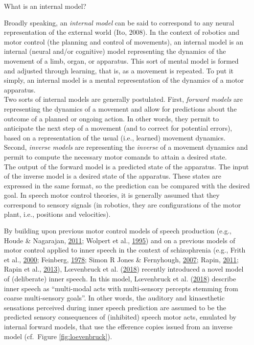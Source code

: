 \documentclass[a4paper,12pt,twoside,onecolumn,openright,final,oldfontcommands]{memoir}
\begin{document}
\begin{mybox}[label = model]{What is an internal model?}

Broadly speaking, an \textit{internal model} can be said to correspond to any neural representation of the external world (Ito, 2008). In the context of robotics and motor control (the planning and control of movements), an internal model is an internal (neural and/or cognitive) model representing the dynamics of the movement of a limb, organ, or apparatus. This sort of mental model is formed and adjusted through learning, that is, as a movement is repeated. To put it simply, an internal model is a mental representation of the dynamics of a motor apparatus.\\

Two sorts of internal models are generally postulated. First, \textit{forward models} are representing the dynamics of a movement and allow for predictions about the outcome of a planned or ongoing action. In other words, they permit to anticipate the next step of a movement (and to correct for potential errors), based on a representation of the usual (i.e., learned) movement dynamics. Second, \textit{inverse models} are representing the \textit{inverse} of a movement dynamics and permit to compute the necessary motor comands to attain a desired state.\\

The output of the forward model is a predicted state of the apparatus. The input of the inverse model is a desired state of the apparatus. These states are expressed in the same format, so the prediction can be compared with the desired goal. In speech motor control theories, it is generally assumed that they correspond to sensory signals (in robotics, they are configurations of the motor plant, i.e., positions and velocities).

\end{mybox}

By building upon previous motor control models of speech production (e.g., Houde \& Nagarajan, \protect\hyperlink{ref-houde_speech_2011}{2011}; Wolpert et al., \protect\hyperlink{ref-wolpert_internal_1995}{1995}) and on a previous models of motor control applied to inner speech in the context of schizophrenia (e.g., Frith et al., \protect\hyperlink{ref-frith_explaining_2000}{2000}; Feinberg, \protect\hyperlink{ref-feinberg_efference_1978}{1978}; Simon R Jones \& Fernyhough, \protect\hyperlink{ref-Jones2007}{2007}; Rapin, \protect\hyperlink{ref-Rapin2011}{2011}; Rapin et al., \protect\hyperlink{ref-Rapin2013}{2013}), Lœvenbruck et al. (\protect\hyperlink{ref-loevenbruck_cognitive_2018}{2018}) recently introduced a novel model of (deliberate) inner speech. In this model, Lœvenbruck et al. (\protect\hyperlink{ref-loevenbruck_cognitive_2018}{2018}) describe inner speech as \enquote{multi-modal acts with multi-sensory percepts stemming from coarse multi-sensory goals}. In other words, the auditory and kinaesthetic sensations perceived during inner speech prediction are assumed to be the predicted sensory consequences of (inhibited) speech motor acts, emulated by internal forward models, that use the efference copies issued from an inverse model (cf.~Figure \ref{fig:loevenbruck}).
\end{document}
